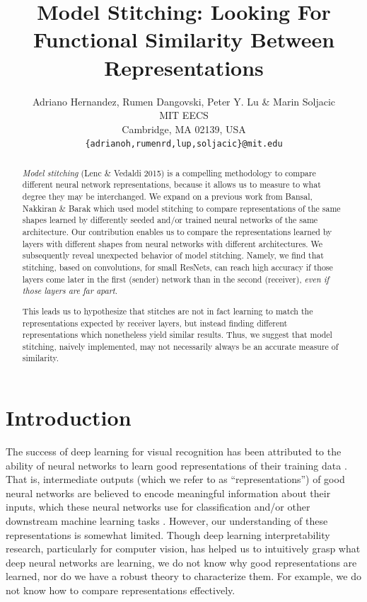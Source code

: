 \documentclass{article}
\title{Model Stitching: Looking For Functional Similarity Between Representations}
\author{Adriano Hernandez, Rumen Dangovski, Peter Y. Lu \& Marin Soljacic\\
MIT EECS\\
Cambridge, MA 02139, USA \\
\texttt{\{adrianoh,rumenrd,lup,soljacic\}@mit.edu}
}
\begin{document}
\maketitle

\begin{abstract}
  \textit{Model stitching} (Lenc \& Vedaldi 2015) is a compelling methodology to compare
  different neural network representations, because it allows us to measure to
  what degree they may be interchanged.
  We expand on a previous work from Bansal, Nakkiran \& Barak which used model stitching to
  compare representations of the same shapes learned by differently seeded
  and/or trained neural networks of the same architecture.
  Our contribution enables us to compare the representations learned by layers with
  different shapes from neural networks with different architectures.
  We subsequently reveal unexpected behavior of model stitching. Namely, we find that stitching, 
  based on convolutions, for small ResNets, can reach
  high accuracy if those layers come later in the first (sender) network than in
  the second (receiver), \textit{even if those layers are far apart}. 

  This leads us to hypothesize that stitches are not in fact learning to match the
  representations expected by receiver layers, but instead finding different representations which nonetheless
  yield similar results. Thus, we suggest that model stitching, naively implemented, may not necessarily always be an
  accurate measure of similarity.
\end{abstract}

\section{Introduction}
The success of deep learning for visual recognition has been attributed to the ability of neural networks to learn
good representations of their training data \cite{Rumelhart1986LearningIR}. That is, intermediate outputs (which we refer
to as ``representations'') of good neural networks 
are believed to encode meaningful information about their inputs, which these neural networks use for classification and/or other
downstream machine learning tasks \cite{goodfellow2016deep}.
However, our understanding of these representations is somewhat limited. Though
deep learning interpretability research, particularly for computer vision, has helped us
to intuitively grasp what deep neural 
networks are learning, we do not
know why good representations are learned, nor do we have a robust theory to characterize them. For example, we do not
know how to compare representations effectively.
\end{document}
